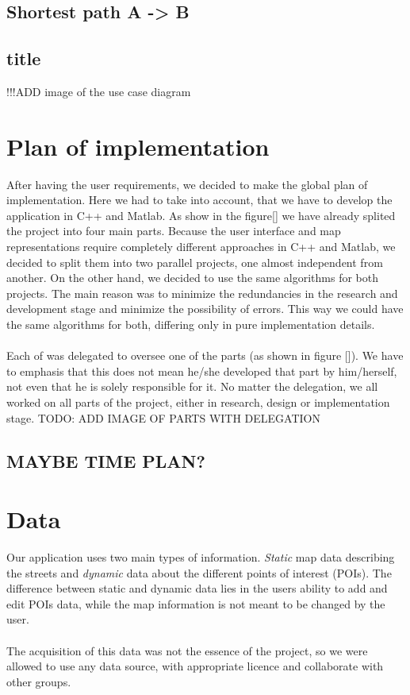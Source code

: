 \documentclass[reqno,openany,12pt]{amsbook}
\theoremstyle{definition}
\theoremstyle{remark}
\begin{document}
\section{Shortest path A -> B}
\section{title}
!!!ADD image of the use case diagram
\chapter{Plan of implementation}
After having the user requirements, we decided to make the global plan of implementation. Here we had to take into account, that we have to develop the application in C++ and Matlab. As show in the figure[] we have already splited  the project into four main parts. Because the user interface and map representations require completely different approaches in C++ and Matlab, we decided to split them into two parallel projects, one almost independent from another. On the other hand, we decided to use the same algorithms for both projects. The main reason was to minimize the redundancies in the research and development stage and minimize the possibility of errors. This way we could have the same algorithms for both, differing only in pure implementation details. \\
\\ Each of was delegated to oversee one of the parts (as shown in figure []). We have to emphasis that this does not mean he/she developed that part by him/herself, not even that he is solely responsible for it. No matter the delegation, we all worked on all parts of the project, either in research, design or implementation stage.
TODO: ADD IMAGE OF PARTS WITH DELEGATION
\section{MAYBE TIME PLAN?}
\chapter{Data}
Our application uses two main types of information. \textit{Static} map data describing the streets and \textit{dynamic} data about the different points of interest (POIs). The difference between static and dynamic data lies in the users ability to add and edit POIs data, while the map information is not meant to be changed by the user. \\
\\ The acquisition of this data was not the essence of the project, so we were allowed to use any data source, with appropriate licence and collaborate with other groups. 
\end{document}
